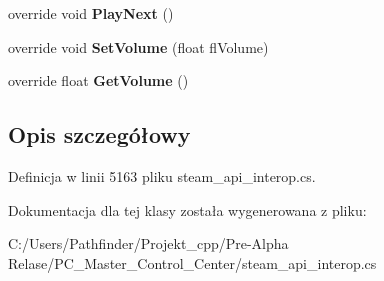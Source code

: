\begin{DoxyCompactItemize}
override void {\bfseries Play\+Next} ()
\item 
\mbox{\label{class_valve_1_1_steamworks_1_1_c_steam_music_aea59a86d58146599f84627872f39687f}} 
override void {\bfseries Set\+Volume} (float fl\+Volume)
\item 
\mbox{\label{class_valve_1_1_steamworks_1_1_c_steam_music_a4ecaf454987a0b1accbfd9167b4926f3}} 
override float {\bfseries Get\+Volume} ()
\end{DoxyCompactItemize}


\subsection{Opis szczegółowy}


Definicja w linii 5163 pliku steam\+\_\+api\+\_\+interop.\+cs.



Dokumentacja dla tej klasy została wygenerowana z pliku\+:\begin{DoxyCompactItemize}
\item 
C\+:/\+Users/\+Pathfinder/\+Projekt\+\_\+cpp/\+Pre-\/\+Alpha Relase/\+P\+C\+\_\+\+Master\+\_\+\+Control\+\_\+\+Center/steam\+\_\+api\+\_\+interop.\+cs\end{DoxyCompactItemize}
